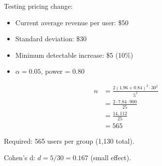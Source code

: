 \begin{example}
Testing pricing change:
\begin{itemize}
    \item Current average revenue per user: \$50
    \item Standard deviation: \$30
    \item Minimum detectable increase: \$5 (10\%)
    \item $\alpha = 0.05$, power = 0.80
\end{itemize}

\begin{align}
n &= \frac{2(1.96 + 0.84)^2 \cdot 30^2}{5^2} \\
  &= \frac{2 \cdot 7.84 \cdot 900}{25} \\
  &= \frac{14,112}{25} \\
  &= 565
\end{align}

Required: 565 users per group (1,130 total).

Cohen's d: $d = 5/30 = 0.167$ (small effect).
\end{example}

